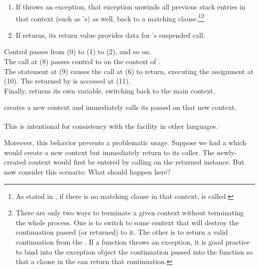 \begin{enumerate}
  \item If  throws an exception, that exception unwinds all previous
        stack entries in that context (such as 's) as well, back to a
        matching  clause.\footnote{As stated in ,
        if there is no matching  clause in that context,
         is called.}\footnote{There are only two ways to
        terminate a given context without terminating the whole process. One
        is to switch to some context that will destroy the continuation passed
        (or returned) to it. The other is to return a valid continuation from
        the \entryfn. If a \resumewith function throws an
        exception, it is good practice to bind into the exception object
        the continuation passed into the \resumewith function so that
        a  clause in the \entryfn can return that continuation.}
  \item If  returns, its return value provides data for
        's suspended  call.
\end{enumerate}


Control passes from (0) to (1) to (2), and so on.\\
The  call at (8) passes control
to  on the context of .\\
The  statement at (9) causes the \resume call at (6) to return,
executing the assignment at (10). The  returned by  is
accessed at (11).\\
Finally,  returns its own  variable, switching back to the main
context.



\callcc creates a new context and immediately calls its passed \entryfn on
that new context.

This is intentional for consistency with the \cc facility in other
languages.\cite{schemecallcc}\textsuperscript{,}\cite{rubycallcc}

Moreover, this behavior prevents a problematic usage. Suppose we had
a  which would create a new context but immediately
return to its caller. The newly-created context would first be entered by
calling \resume on the returned \cont instance.
But now consider this scenario:
What should happen here?

